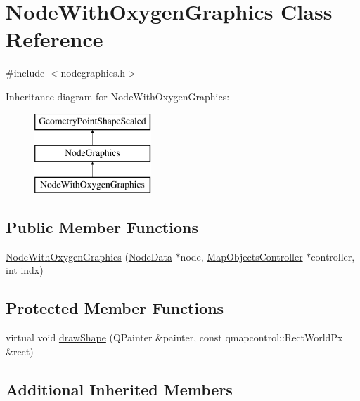 \hypertarget{class_node_with_oxygen_graphics}{}\section{Node\+With\+Oxygen\+Graphics Class Reference}
\label{class_node_with_oxygen_graphics}


{\ttfamily \#include $<$nodegraphics.\+h$>$}

Inheritance diagram for Node\+With\+Oxygen\+Graphics\+:\begin{figure}[H]
\begin{center}
\leavevmode
\includegraphics[height=3.000000cm]{d4/d43/class_node_with_oxygen_graphics}
\end{center}
\end{figure}
\subsection*{Public Member Functions}
\begin{DoxyCompactItemize}
\item 
\mbox{\hyperlink{class_node_with_oxygen_graphics_ab73b30626b6cd82f087b88f30b8ae958}{Node\+With\+Oxygen\+Graphics}} (\mbox{\hyperlink{class_node_data}{Node\+Data}} $\ast$node, \mbox{\hyperlink{class_map_objects_controller}{Map\+Objects\+Controller}} $\ast$controller, int indx)
\end{DoxyCompactItemize}
\subsection*{Protected Member Functions}
\begin{DoxyCompactItemize}
\item 
virtual void \mbox{\hyperlink{class_node_with_oxygen_graphics_a173de15e8ae7e2f1a22c2075e67f03f6}{draw\+Shape}} (Q\+Painter \&painter, const qmapcontrol\+::\+Rect\+World\+Px \&rect)
\end{DoxyCompactItemize}
\subsection*{Additional Inherited Members}


